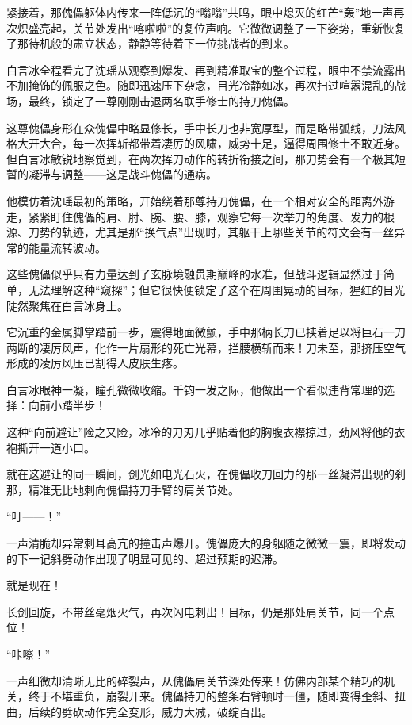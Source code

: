 紧接着，那傀儡躯体内传来一阵低沉的“嗡嗡”共鸣，眼中熄灭的红芒“轰”地一声再次炽盛亮起，关节处发出“喀啦啦”的复位声响。它微微调整了一下姿势，重新恢复了那待机般的肃立状态，静静等待着下一位挑战者的到来。

\vspace{2em}

白言冰全程看完了沈瑶从观察到爆发、再到精准取宝的整个过程，眼中不禁流露出不加掩饰的佩服之色。随即迅速压下杂念，目光冷静如冰，再次扫过喧嚣混乱的战场，最终，锁定了一尊刚刚击退两名联手修士的持刀傀儡。

这尊傀儡身形在众傀儡中略显修长，手中长刀也非宽厚型，而是略带弧线，刀法风格大开大合，每一次挥斩都带着凄厉的风啸，威势十足，逼得周围修士不敢近身。但白言冰敏锐地察觉到，在两次挥刀动作的转折衔接之间，那刀势会有一个极其短暂的凝滞与调整——这是战斗傀儡的通病。

他模仿着沈瑶最初的策略，开始绕着那尊持刀傀儡，在一个相对安全的距离外游走，紧紧盯住傀儡的肩、肘、腕、腰、膝，观察它每一次举刀的角度、发力的根源、刀势的轨迹，尤其是那“换气点”出现时，其躯干上哪些关节的符文会有一丝异常的能量流转波动。

这些傀儡似乎只有力量达到了玄脉境融贯期巅峰的水准，但战斗逻辑显然过于简单，无法理解这种“窥探”；但它很快便锁定了这个在周围晃动的目标，猩红的目光陡然聚焦在白言冰身上。

它沉重的金属脚掌踏前一步，震得地面微颤，手中那柄长刀已挟着足以将巨石一刀两断的凄厉风声，化作一片扇形的死亡光幕，拦腰横斩而来！刀未至，那挤压空气形成的凌厉风压已割得人皮肤生疼。

白言冰眼神一凝，瞳孔微微收缩。千钧一发之际，他做出一个看似违背常理的选择：向前小踏半步！

这种“向前避让”险之又险，冰冷的刀刃几乎贴着他的胸腹衣襟掠过，劲风将他的衣袍撕开一道小口。

就在这避让的同一瞬间，剑光如电光石火，在傀儡收刀回力的那一丝凝滞出现的刹那，精准无比地刺向傀儡持刀手臂的肩关节处。

“叮——！”

一声清脆却异常刺耳高亢的撞击声爆开。傀儡庞大的身躯随之微微一震，即将发动的下一记斜劈动作出现了明显可见的、超过预期的迟滞。

就是现在！

长剑回旋，不带丝毫烟火气，再次闪电刺出！目标，仍是那处肩关节，同一个点位！

“咔嚓！”

一声细微却清晰无比的碎裂声，从傀儡肩关节深处传来！仿佛内部某个精巧的机关，终于不堪重负，崩裂开来。傀儡持刀的整条右臂顿时一僵，随即变得歪斜、扭曲，后续的劈砍动作完全变形，威力大减，破绽百出。

